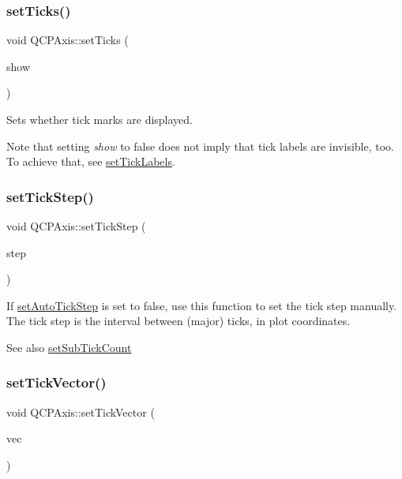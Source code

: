 \subsubsection{\texorpdfstring{set\+Ticks()}{setTicks()}}
{\footnotesize\ttfamily void Q\+C\+P\+Axis\+::set\+Ticks (\begin{DoxyParamCaption}\item[{bool}]{show }\end{DoxyParamCaption})}

Sets whether tick marks are displayed.

Note that setting {\itshape show} to false does not imply that tick labels are invisible, too. To achieve that, see \mbox{\hyperlink{class_q_c_p_axis_a04ba16e1f6f78d70f938519576ed32c8}{set\+Tick\+Labels}}. \mbox{\label{class_q_c_p_axis_af727db0acc6492c4c774c0700e738205}} 
\subsubsection{\texorpdfstring{set\+Tick\+Step()}{setTickStep()}}
{\footnotesize\ttfamily void Q\+C\+P\+Axis\+::set\+Tick\+Step (\begin{DoxyParamCaption}\item[{double}]{step }\end{DoxyParamCaption})}

If \mbox{\hyperlink{class_q_c_p_axis_a99fe77b034e06f5b723995beab96e741}{set\+Auto\+Tick\+Step}} is set to false, use this function to set the tick step manually. The tick step is the interval between (major) ticks, in plot coordinates. \begin{DoxySeeAlso}{See also}
\mbox{\hyperlink{class_q_c_p_axis_a4b1554ead9d7f9799650d51383e326dd}{set\+Sub\+Tick\+Count}} 
\end{DoxySeeAlso}
\mbox{\label{class_q_c_p_axis_a871db94c5d796c80fcbe1a9d4506e27e}} 
\subsubsection{\texorpdfstring{set\+Tick\+Vector()}{setTickVector()}}
{\footnotesize\ttfamily void Q\+C\+P\+Axis\+::set\+Tick\+Vector (\begin{DoxyParamCaption}\item[{const Q\+Vector$<$ double $>$ \&}]{vec }\end{DoxyParamCaption})}

